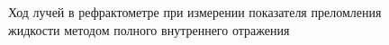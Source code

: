 \documentclass[12pt]{article}
\begin{document}
    \begin{figure}[h!]
        \noindent{}
        \caption{Ход лучей в рефрактометре при измерении показателя преломления жидкости методом полного внутреннего отражения}
    \end{figure} 
\newpage
\end{document}
